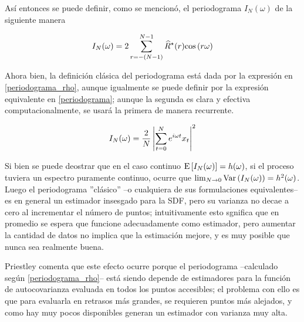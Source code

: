 As\'i entonces se puede definir, como se mencion\'o, 
el periodograma $I_N(\omega)$ de la siguiente manera

\begin{equation}
I_N(\omega) = 2 \sum_{r = -(N-1)}^{N-1} \widehat{ R }^{\star}(r) \mathrm{cos}\left( r \omega \right)
\label{periodograma_rho}
\end{equation}

Ahora bien, la definici\'on cl\'asica del periodograma est\'a dada por la expresi\'on
en \ref{periodograma_rho}, 
aunque igualmente se puede definir por la expresi\'on equivalente
en \ref{periodograma}; aunque la segunda es clara y efectiva computacionalmente, se usar\'a
la primera de manera recurrente.

\begin{equation}
I_N(\omega) = \frac{2}{N} \left|  \sum_{t=0}^{N} e^{i \omega t} x_t  \right|^{2}
\label{periodograma}
\end{equation}


Si bien se puede deostrar que en el caso continuo 
$\mathrm{E}\left[ I_N(\omega) \right]=h(\omega)$, si el proceso tuviera un espectro puramente continuo,
ocurre que $\lim_{N\rightarrow 0} \mathrm{Var}\left( I_N(\omega) \right) = h^{2}(\omega)$. Luego el
periodograma ''cl\'asico'' --o cualquiera de sus formulaciones equivalentes-- es 
en general
un estimador
insesgado para la SDF, pero su varianza no decae a cero al incrementar el n\'umero de puntos;
intuitivamente esto sgnifica que en promedio se espera que funcione adecuadamente como
estimador, pero
aumentar la cantidad de datos no implica que la estimaci\'on mejore,%
y es muy posible que nunca sea realmente buena.

Priestley comenta que este efecto ocurre porque
el periodograma --calculado seg\'un \ref{periodograma_rho}--
est\'a siendo depende de estimadores para la funci\'on de autocovarianza evaluada en todos los 
puntos accesibles; 
el problema con ello es que para evaluarla en retrasos m\'as grandes, 
se requieren puntos m\'as alejados, y como hay muy pocos disponibles
generan un estimador con varianza muy alta.

